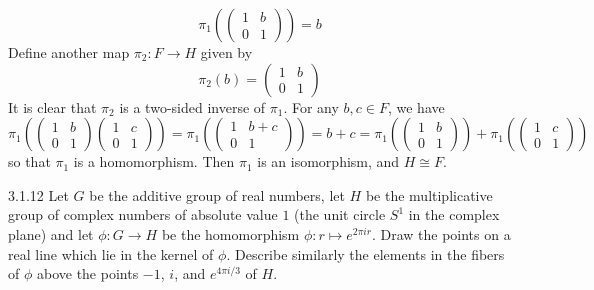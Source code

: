 \begin{solenum}
    \[
    	\pi_1\left(
        \begin{pmatrix}
            1 & b \\
            0 & 1
        \end{pmatrix}\right) = b
	\]
    Define another map $\pi_2 : F \to H$ given by
    \[
    	\pi_2(b) = 
        \begin{pmatrix}
            1 & b \\
            0 & 1
        \end{pmatrix}
	\]
    It is clear that $\pi_2$ is a two-sided inverse of $\pi_1$.
	For any $b, c \in F$, we have
    \[
    	\pi_1\left(
        \begin{pmatrix}
            1 & b \\
            0 & 1
        \end{pmatrix}
        \begin{pmatrix}
            1 & c \\
            0 & 1
        \end{pmatrix}\right) = 
        \pi_1\left(
        \begin{pmatrix}
            1 & b + c \\
            0 & 1
        \end{pmatrix}\right) = b + c = 
        \pi_1\left(
        \begin{pmatrix}
            1 & b \\
            0 & 1
        \end{pmatrix}\right) + 
        \pi_1\left(
        \begin{pmatrix}
            1 & c \\
            0 & 1
        \end{pmatrix}\right)
	\]
    so that $\pi_1$ is a homomorphism.
	Then $\pi_1$ is an isomorphism, and $H \cong F$.
\end{solenum}

\begin{exercise}{3.1.12}
    Let $G$ be the additive group of real numbers, let $H$ be the multiplicative group of complex numbers of absolute value $1$ (the unit circle $S^1$ in the complex plane) and let $\phi : G \to H$ be the homomorphism $\phi : r \mapsto e^{2\pi i r}$.
	Draw the points on a real line which lie in the kernel of $\phi$.
	Describe similarly the elements in the fibers of $\phi$ above the points $-1$, $i$, and $e^{4\pi i/3}$ of $H$.
\end{exercise}

